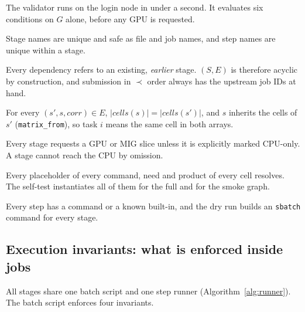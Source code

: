 \documentclass[pdflatex,sn-mathphys-num]{sn-jnl}
\theoremstyle{thmstyleone}%
\theoremstyle{thmstyletwo}%
\theoremstyle{thmstylethree}%
\newcommand{\code}[1]{\texttt{#1}}
\newcommand{\V}[1]{\textsf{V#1}}
\begin{document}
The validator runs on the login node in under a second. It evaluates six
conditions on $G$ alone, before any GPU is requested.
\begin{description}[leftmargin=1.1em, style=nextline, itemsep=1pt]
\item[\V{1} Identity] Stage names are unique and safe as file and job names,
and step names are unique within a stage.
\item[\V{2} Order] Every dependency refers to an existing, \emph{earlier}
stage. $(S,E)$ is therefore acyclic by construction, and submission in $\prec$
order always has the upstream job IDs at hand.
\item[\V{3} Correspondence] For every $(s',s,\mathit{corr})\in E$,
$|\mathit{cells}(s)|=|\mathit{cells}(s')|$, and $s$ inherits the cells of $s'$
(\code{matrix\_from}), so task $i$ means the same cell in both arrays.
\item[\V{4} GPU policy] Every stage requests a GPU or MIG slice unless it is
explicitly marked CPU-only. A stage cannot reach the CPU by omission.
\item[\V{5} Closure] Every placeholder of every command, need and product of
every cell resolves. The self-test instantiates all of them for the full and
for the smoke graph.
\item[\V{6} Executability] Every step has a command or a known built-in, and
the dry run builds an \code{sbatch} command for every stage.
\end{description}

\subsection{Execution invariants: what is enforced inside jobs}\label{sec:invariants}

All stages share one batch script and one step runner (Algorithm~\ref{alg:runner}).
The batch script enforces four invariants.
\end{document}
